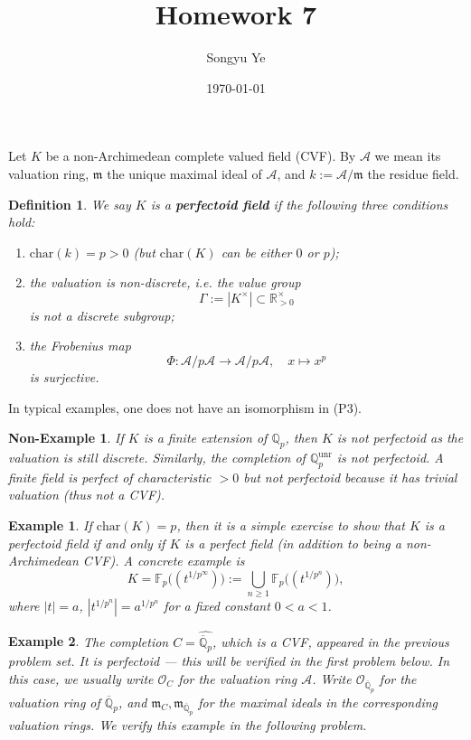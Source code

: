 \documentclass[12pt]{article}  %
\title{Homework 7}
\author{Songyu Ye}
\date{\today}
\newtheorem{nonexample}{Non-Example}
\newtheorem{example}{Example}
\newtheorem{definition}{Definition}
\begin{document}
\psettitle


Let $K$ be a non-Archimedean complete valued field (CVF).  
By $\mathcal{A}$ we mean its valuation ring, $\mathfrak{m}$ the unique maximal ideal of $\mathcal{A}$, and $k := \mathcal{A}/\mathfrak{m}$ the residue field.

\begin{definition}
We say $K$ is a \textbf{perfectoid field} if the following three conditions hold:
\begin{enumerate}[label=(P\arabic*)]
\item $\mathrm{char}(k) = p > 0$ (but $\mathrm{char}(K)$ can be either $0$ or $p$);
\item the valuation is non-\emph{discrete}, i.e. the value group 
  \[
  \Gamma := |K^\times| \subset \mathbb{R}_{>0}^\times
  \]
  is not a discrete subgroup;
\item the Frobenius map 
  \[
  \Phi : \mathcal{A}/p\mathcal{A} \to \mathcal{A}/p\mathcal{A}, \quad x \mapsto x^p
  \]
  is surjective.
\end{enumerate}
\end{definition}
In typical examples, one does not have an isomorphism in (P3).

\begin{nonexample}
If $K$ is a finite extension of $\mathbb{Q}_p$, then $K$ is not perfectoid as the valuation is still discrete. Similarly, the completion of $\mathbb{Q}_p^{\mathrm{unr}}$ is not perfectoid.  
A finite field is perfect of characteristic $>0$ but \emph{not} perfectoid because it has trivial valuation (thus not a CVF).
\end{nonexample}

\begin{example}
If $\mathrm{char}(K) = p$, then it is a simple exercise to show that $K$ is a perfectoid field if and only if $K$ is a perfect field (in addition to being a non-Archimedean CVF).  
A concrete example is
\[
K = \mathbb{F}_p\bigl((t^{1/p^\infty})\bigr) := \bigcup_{n \ge 1} \mathbb{F}_p\bigl((t^{1/p^n})\bigr),
\]
where $|t| = a$, $|t^{1/p^n}| = a^{1/p^n}$ for a fixed constant $0 < a < 1$.
\end{example}

\begin{example}
The completion $C = \widehat{\overline{\mathbb{Q}}_p}$, which is a CVF, appeared in the previous problem set.  
It is perfectoid --- this will be verified in the first problem below.  
In this case, we usually write $\mathcal{O}_C$ for the valuation ring $\mathcal{A}$.  
Write $\mathcal{O}_{\overline{\mathbb{Q}}_p}$ for the valuation ring of $\overline{\mathbb{Q}}_p$, and $\mathfrak{m}_C, \mathfrak{m}_{\overline{\mathbb{Q}}_p}$ for the maximal ideals in the corresponding valuation rings.  
We verify this example in the following problem.
\end{example}
\end{document}
